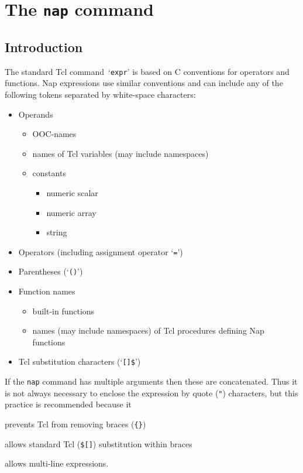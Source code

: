 
\section{The \texttt{nap} command}

\subsection{Introduction}

The standard Tcl command\  `\texttt{expr}' is based on C conventions for operators and
    functions. Nap expressions use similar conventions and can include
    any of the following tokens separated by white-space
    characters:
    \begin{itemize}
      \item Operands
      \begin{itemize}
        \item OOC-names
        \item names of Tcl variables (may include namespaces)
        \item constants
        \begin{itemize}
          \item numeric scalar
          \item numeric array
          \item string
        \end{itemize}
      \end{itemize}
      \item Operators (including assignment operator `\texttt{=}')
      \item Parentheses (`\texttt{()}')
      \item Function names
      \begin{itemize}
        \item built-in functions
        \item names (may include namespaces) of Tcl procedures defining
        Nap functions
      \end{itemize}
      \item Tcl substitution characters (`\texttt{[]\$}')
    \end{itemize}
    

If the 
    \texttt{nap} command has multiple arguments then these are
    concatenated. Thus it is not always necessary to enclose the
    expression by quote (\texttt{"}) characters, but this practice is recommended
    because it
\begin{bullets}
      \item prevents Tcl from removing braces (\texttt{\{\}})
      \item allows standard Tcl (\texttt{\$[]}) substitution within braces
      \item allows multi-line expressions.
\end{bullets}

